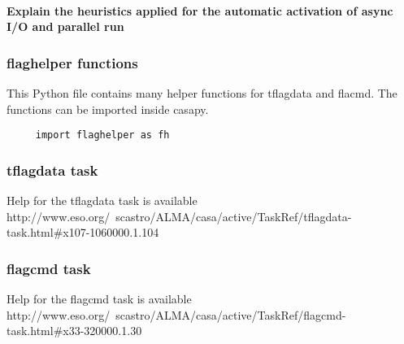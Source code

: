 \paragraph{Explain the heuristics applied for the automatic activation of async
I/O and parallel run}

\subsubsection{flaghelper functions}

This Python file contains many helper functions for tflagdata and flacmd. The
functions can be imported inside casapy.

\begin{verbatim}
     import flaghelper as fh
\end{verbatim}

\subsubsection{tflagdata task}
Help for the tflagdata task is available 
{http://www.eso.org/~scastro/ALMA/casa/active/TaskRef/tflagdata-task.html#x107-1060000.1.104}

\subsubsection{flagcmd task}
Help for the flagcmd task is available 
{http://www.eso.org/~scastro/ALMA/casa/active/TaskRef/flagcmd-task.html#x33-320000.1.30}




